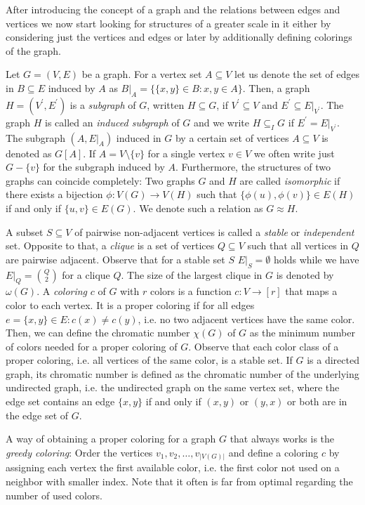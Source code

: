 After introducing the concept of a graph and the relations between edges and vertices we now start looking for structures of a greater scale in it either by considering just the vertices and edges or later by additionally defining colorings of the graph. 

Let $G=(V,E)$ be a graph. For a vertex set $A\subseteq V$ let us denote the set of edges in $B\subseteq E$ induced by $A$ as $B\vert_A=\lbrace \lbrace x,y\rbrace\in B : x,y\in A\rbrace$. Then, a graph $H=(V^\prime ,E^\prime )$ is a \textit{subgraph} of $G$, written $H\subseteq G$, if $V^\prime\subseteq V$ and $E^\prime\subseteq E\vert_{V^\prime}$. The graph $H$ is called an \textit{induced subgraph} of $G$ and we write $H\subseteq_I G$ if $E^\prime = E\vert_{V^\prime}$. The subgraph $(A,E\vert_A)$ induced in $G$ by a certain set of vertices $A\subseteq V$ is denoted as $G[A]$. If $A=V\setminus \{v\}$ for a single vertex $v\in V$ we often write just $G-\{v\}$ for the subgraph induced by $A$. Furthermore, the structures of two graphs can coincide completely: Two graphs $G$ and $H$ are called \textit{isomorphic} if there exists a bijection $\phi :V(G)\to V(H)$ such that $\lbrace\phi (u), \phi (v)\rbrace\in E(H)$ if and only if $\lbrace u, v\rbrace\in E(G)$. We denote such a relation as $G\approx H$.

A subset $S\subseteq V$ of pairwise non-adjacent vertices is called a \textit{stable} or \textit{independent} set. Opposite to that, a \textit{clique} is a set of vertices $Q\subseteq V$ such that all vertices in $Q$ are pairwise adjacent. Observe that for a stable set $S$ $E\vert_S =\emptyset$ holds while we have $E\vert_Q={Q\choose 2}$ for a clique $Q$. The size of the largest clique in $G$ is denoted by $\omega (G)$. A \textit{coloring} $c$ of $G$ with $r$ colors is a function $c:V\to [r]$ that maps a color to each vertex. It is a proper coloring if for all edges $e = \lbrace x,y\rbrace\in E: c(x)\neq c(y)$, i.e. no two adjacent vertices have the same color. Then, we can define the chromatic number $\chi (G)$ of $G$ as the minimum number of colors needed for a proper coloring of $G$. Observe that each color class of a proper coloring, i.e. all vertices of the same color, is a stable set. If $G$ is a directed graph, its chromatic number is defined as the chromatic number of the underlying undirected graph, i.e. the undirected graph on the same vertex set, where the edge set contains an edge $\{x,y\}$ if and only if $(x,y)$ or $(y,x)$ or both are in the edge set of $G$.

A way of obtaining a proper coloring for a graph $G$ that always works is the \textit{greedy coloring}: Order the vertices $v_1, v_2, \dots ,v_{\vert V(G) \vert }$ and define a coloring $c$ by assigning each vertex the first available color, i.e. the first color not used on a neighbor with smaller index. Note that it often is far from optimal regarding the number of used colors.\\

